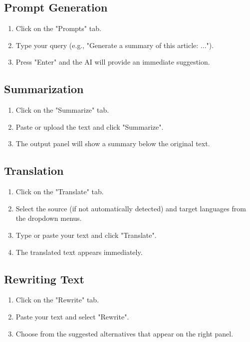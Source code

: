 \documentclass{article}
\begin{document}
\subsection{Prompt Generation}
\begin{enumerate}
    \item Click on the "Prompts" tab.
    \item Type your query (e.g., "Generate a summary of this article: ...").
    \item Press "Enter" and the AI will provide an immediate suggestion.
\end{enumerate}

\subsection{Summarization}
\begin{enumerate}
    \item Click on the "Summarize" tab.
    \item Paste or upload the text and click "Summarize".
    \item The output panel will show a summary below the original text.
\end{enumerate}

\subsection{Translation}
\begin{enumerate}
    \item Click on the  "Translate" tab.
    \item Select the source (if not automatically detected) and target languages from the dropdown menus.
    \item Type or paste your text and click "Translate".
    \item The translated text appears immediately.
\end{enumerate}

\subsection{Rewriting Text}
\begin{enumerate}
    \item Click on the "Rewrite" tab.
    \item Paste your text and select "Rewrite".
    \item Choose from the suggested alternatives that appear on the right panel.
\end{enumerate}
\end{document}
